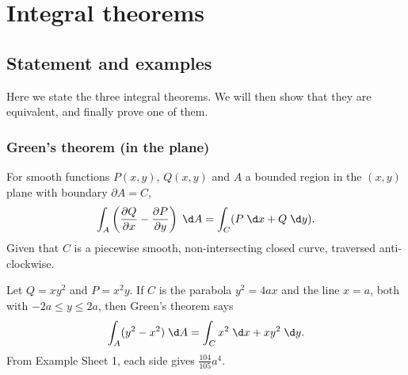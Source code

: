 \documentclass[a4paper]{article}
\begin{document}
\section{Integral theorems}
\subsection{Statement and examples}
Here we state the three integral theorems. We will then show that they are equivalent, and finally prove one of them.
\subsubsection{Green's theorem (in the plane)}
\begin{thm}
  For smooth functions $P(x, y)$, $Q(x, y)$ and $A$ a bounded region in the $(x, y)$ plane with boundary $\partial A = C$,
  \[
    \int_A \left(\frac{\partial Q}{\partial x} - \frac{\partial P}{\partial y}\right)\;\d A = \int_C(P\;\d x + Q\;\d y).
  \]
  Given that $C$ is a piecewise smooth, non-intersecting closed curve, traversed anti-clockwise.
\end{thm}

\begin{eg}
  Let $Q = xy^2$ and $P = x^2y$. If $C$ is the parabola $y^2 = 4ax$ and the line $x = a$, both with $-2a \leq y \leq 2a$, then Green's theorem says
  \[
    \int_A (y^2 - x^2)\;\d A = \int_C x^2 \;\d x + xy^2\;\d y.
  \]
  From Example Sheet 1, each side gives $\frac{104}{105} a^4$.
\end{eg}
\end{document}
